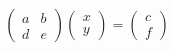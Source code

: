 \documentclass[preview]{standalone}
\begin{document}
\begin{align*}
\begin{pmatrix} a & b \\ d & e \end{pmatrix} \begin{pmatrix} x \\ y \end{pmatrix} = \begin{pmatrix} c \\ f \end{pmatrix}
\end{align*}
\end{document}
